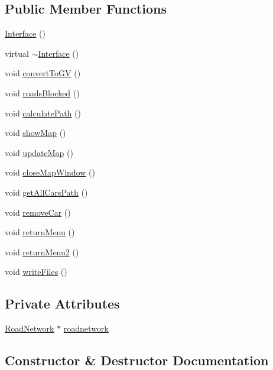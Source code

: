 \subsection*{Public Member Functions}
\begin{DoxyCompactItemize}
\item 
\hyperlink{classInterface_a4406d74c75bdfe150bf72be1f1cda8b1}{Interface} ()
\item 
virtual \hyperlink{classInterface_a19179888f29f18f1be54a3dfe98f68c0}{$\sim$\+Interface} ()
\item 
void \hyperlink{classInterface_a04428812c5138654aaed3c17bc8f7deb}{convert\+To\+GV} ()
\item 
void \hyperlink{classInterface_a8b09945f62fc12fb90de30046042efe3}{roads\+Blocked} ()
\item 
void \hyperlink{classInterface_ae4cad587f14fd078f118858ef2f73015}{calculate\+Path} ()
\item 
void \hyperlink{classInterface_aec46d793b0a3ac1196dd61df896e154a}{show\+Map} ()
\item 
void \hyperlink{classInterface_a4134df58f667cd4d51f3666828cff73b}{update\+Map} ()
\item 
void \hyperlink{classInterface_a3afcfe1089d52a1359602dca26611657}{close\+Map\+Window} ()
\item 
void \hyperlink{classInterface_a3e043e9aa51fa1e16436d1a3247a9daa}{get\+All\+Cars\+Path} ()
\item 
void \hyperlink{classInterface_a2bbf8267df70e1aa4a225ab4ca17ff66}{remove\+Car} ()
\item 
void \hyperlink{classInterface_ac9d3a7f7dd91e5684e988942d1e62c6f}{return\+Menu} ()
\item 
void \hyperlink{classInterface_a7b37d708a88660698fc79f0e7bbedb95}{return\+Menu2} ()
\item 
void \hyperlink{classInterface_afa0a2e9fbced7c9451e2a3cddcd39d6a}{write\+Files} ()
\end{DoxyCompactItemize}
\subsection*{Private Attributes}
\begin{DoxyCompactItemize}
\item 
\hyperlink{classRoadNetwork}{Road\+Network} $\ast$ \hyperlink{classInterface_aae76b1bb86e685e441c21f5f5b68ef99}{roadnetwork}
\end{DoxyCompactItemize}


\subsection{Constructor \& Destructor Documentation}
